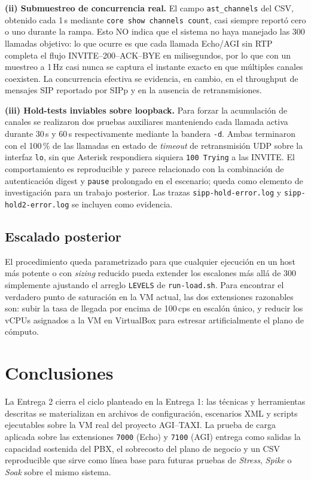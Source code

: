 \documentclass[conference]{IEEEtran}
\begin{document}
\textbf{(ii) Submuestreo de concurrencia real.} El campo
\texttt{ast\_channels} del CSV, obtenido cada 1\,s mediante
\texttt{core show channels count}, casi siempre report\'o cero o uno
durante la rampa. Esto NO indica que el sistema no haya manejado las
300 llamadas objetivo: lo que ocurre es que cada llamada Echo/AGI sin
RTP completa el flujo INVITE--200--ACK--BYE en milisegundos, por lo que
con un muestreo a 1\,Hz casi nunca se captura el instante exacto en que
m\'ultiples canales coexisten. La concurrencia efectiva se evidencia,
en cambio, en el throughput de mensajes SIP reportado por SIPp y en la
ausencia de retransmisiones.

\textbf{(iii) Hold-tests inviables sobre loopback.} Para forzar la
acumulaci\'on de canales se realizaron dos pruebas auxiliares
manteniendo cada llamada activa durante 30\,s y 60\,s respectivamente
mediante la bandera \texttt{-d}. Ambas terminaron con el 100\,\% de
las llamadas en estado de \textit{timeout} de retransmisi\'on UDP
sobre la interfaz \texttt{lo}, sin que Asterisk respondiera siquiera
\texttt{100 Trying} a las INVITE. El comportamiento es reproducible y
parece relacionado con la combinaci\'on de autenticaci\'on digest y
\texttt{pause} prolongado en el escenario; queda como elemento de
investigaci\'on para un trabajo posterior. Las trazas
\texttt{sipp-hold-error.log} y \texttt{sipp-hold2-error.log} se
incluyen como evidencia.

\subsection{Escalado posterior}

El procedimiento queda parametrizado para que cualquier ejecuci\'on en
un host m\'as potente o con \textit{sizing} reducido pueda extender los
escalones m\'as all\'a de 300 simplemente ajustando el arreglo
\texttt{LEVELS} de \texttt{run-load.sh}. Para encontrar el verdadero
punto de saturaci\'on en la VM actual, las dos extensiones razonables
son: subir la tasa de llegada por encima de 100\,cps en escal\'on
\'unico, y reducir los vCPUs asignados a la VM en VirtualBox para
estresar artificialmente el plano de cómputo.

\section{Conclusiones}

La Entrega 2 cierra el ciclo planteado en la Entrega 1: las t\'ecnicas
y herramientas descritas se materializan en archivos de configuraci\'on,
escenarios XML y scripts ejecutables sobre la VM real del proyecto
AGI--TAXI. La prueba de carga aplicada sobre las extensiones
\texttt{7000} (Echo) y \texttt{7100} (AGI) entrega como salidas la
capacidad sostenida del PBX, el sobrecosto del plano de negocio y un
CSV reproducible que sirve como l\'inea base para futuras pruebas de
\textit{Stress}, \textit{Spike} o \textit{Soak} sobre el mismo
sistema.
\end{document}
